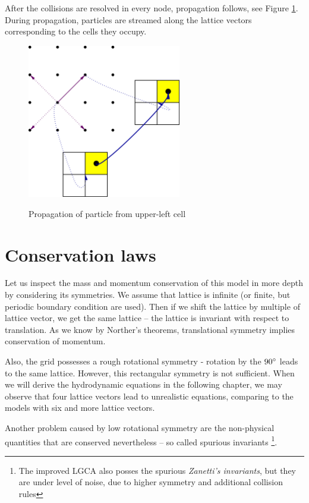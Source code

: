 After the collisions are resolved in every node, propagation follows, see Figure \ref{hpp-prop}.
During propagation, particles are streamed along the lattice vectors corresponding to the cells they occupy.
\begin{figure} [H]
 \centering
 \includegraphics[width=0.6\textwidth]{./img/HPPprop}
 \label{hpp-prop}
 \caption{Propagation of particle from upper-left cell}
\end{figure}

\bigskip

\section{Conservation laws}
 
Let us inspect the mass and momentum conservation of this model in more depth by considering its symmetries.
We assume that lattice is infinite (or finite, but periodic boundary condition are used). Then if we shift the lattice by multiple of lattice vector, we get the same lattice -- the lattice is invariant with respect to translation.
As we know by Norther's theorems, translational symmetry implies conservation of momentum.

Also, the grid possesses a rough rotational symmetry - rotation by the $90\degree$ leads to the same lattice.
However, this rectangular symmetry is not sufficient.
When we will derive the hydrodynamic equations in the following chapter, we may observe that four lattice vectors lead to unrealistic equations, comparing to the models with six and more lattice vectors.

Another problem caused by low rotational symmetry are the non-physical quantities that are conserved nevertheless -- so called spurious invariants \footnote{The improved LGCA also posses the spurious \textit{Zanetti's invariants}, but they are under level of noise, due to higher symmetry and additional collision rules}.

